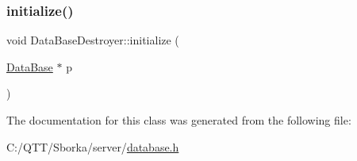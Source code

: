 \subsubsection{\texorpdfstring{initialize()}{initialize()}}
{\footnotesize\ttfamily void Data\+Base\+Destroyer\+::initialize (\begin{DoxyParamCaption}\item[{\mbox{\hyperlink{class_data_base}{Data\+Base}} $\ast$}]{p }\end{DoxyParamCaption})\hspace{0.3cm}{\ttfamily [inline]}}



The documentation for this class was generated from the following file\+:\begin{DoxyCompactItemize}
\item 
C\+:/\+Q\+T\+T/\+Sborka/server/\mbox{\hyperlink{database_8h}{database.\+h}}\end{DoxyCompactItemize}
